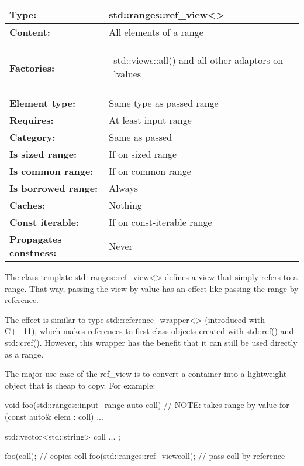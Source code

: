 \begin{longtable}[c]{|l|l|}
	\hline
	\textbf{Type:}                 & std::ranges::ref\_view\textless{}\textgreater{} \\ \hline
	\endfirsthead
	\endhead
	\textbf{Content:}              & All elements of a range   \\ \hline
	\textbf{Factories:}      & \begin{tabular}[c]{@{}l@{}}std::views::all() and all other adaptors on lvalues\end{tabular} \\ \hline
	\textbf{Element type:}         & Same type as passed range                 \\ \hline
	\textbf{Requires:}             & At least input range                       \\ \hline
	\textbf{Category:}             & Same as passed                                 \\ \hline
	\textbf{Is sized range:} & If on sized range                                                \\ \hline
	\textbf{Is common range:}      & If on common range                         \\ \hline
	\textbf{Is borrowed range:}    & Always                                         \\ \hline
	\textbf{Caches:}               & Nothing                                        \\ \hline
	\textbf{Const iterable:}       & If on const-iterable range               \\ \hline
	\textbf{Propagates constness:} & Never                                          \\ \hline
\end{longtable}

The class template std::ranges::ref\_view<> defines a view that simply refers to a range. That way, passing the view by value has an effect like passing the range by reference.

The effect is similar to type std::reference\_wrapper<> (introduced with C++11), which makes references to first-class objects created with std::ref() and std::cref(). However, this wrapper has the benefit that it can still be used directly as a range.

The major use case of the ref\_view is to convert a container into a lightweight object that is cheap to copy. For example:

\begin{cpp}
void foo(std::ranges::input_range auto coll) // NOTE: takes range by value
{
	for (const auto& elem : coll) {
		...
	}
}

std::vector<std::string> coll{ ... };

foo(coll); // copies coll
foo(std::ranges::ref_view{coll}); // pass coll by reference
\end{cpp}

